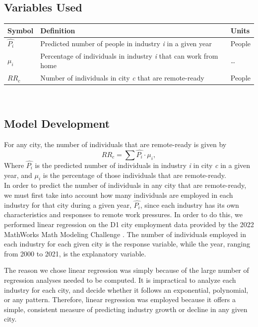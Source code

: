 \documentclass{article}
\begin{document}
\subsection{Variables Used} \indent
\begin{table}[h]
\centering
\begin{tabularx}{\linewidth}{|l|>{\raggedright\arraybackslash}X|>{\raggedright\arraybackslash}X|}
\hline
    \textbf{Symbol} & \textbf{Definition} & \textbf{Units} \\
    \hline
    $\hat{P_i}$ & Predicted number of people in industry \textit{i} in a given year & People   \\
    \hline
    $\mu_i$ & Percentage of individuals in industry \textit{i} that can work from home & \dots \\
    \hline
    $RR_c$ & Number of individuals in city \textit{c} that are remote-ready & People \\
    \hline
\end{tabularx}
\end{table}

\

\subsection{Model Development}
For any city, the number of individuals that are remote-ready is given by 
\[
RR_c = \sum \hat{P_i} \cdot \mu_i,
\]
\indent
Where $\hat{P_i}$ is the predicted number of individuals in industry \textit{i} in city \textit{c} in a given year, and $\mu_i$ is the percentage of those individuals that are remote-ready. \\
In order to predict the number of individuals in any city that are remote-ready, we must first take into account how many individuals are employed in each industry for that city during a given year, $\hat{P_i}$, since each industry has its own characteristics and responses to remote work pressures. In order to do this, we performed linear regression on the D1 city employment data provided by the 2022 MathWorks Math Modeling Challenge \cite{m3data}. The number of individuals employed in each industry for each given city is the response variable, while the year, ranging from 2000 to 2021, is the explanatory variable.

The reason we chose linear regression was simply because of the large number of regression analyses needed to be computed. It is impractical to analyze each industry for each city, and decide whether it follows an exponential, polynomial, or any pattern. Therefore, linear regression was employed because it offers a simple, consistent measure of predicting industry growth or decline in any given city. \\
\end{document}
